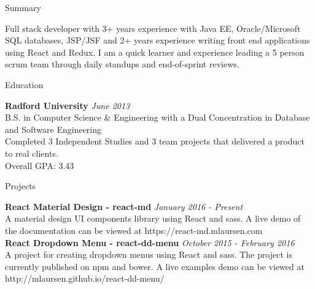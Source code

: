 \documentclass{resume} %
\begin{document}

\begin{rSection}{Summary}

Full stack developer with 3+ years experience with Java EE, Oracle/Microsoft SQL databases, JSP/JSF and 2+ years experience writing front end applications using React and Redux. I am a quick learner and experience leading a 5 person scrum team through daily standups and end-of-sprint reviews.

\end{rSection}


\begin{rSection}{Education}

{\bf Radford University} \hfill {\em June 2013} \\ 
B.S. in Computer Science \& Engineering with a Dual Concentration in Database and Software Engineering \\
Completed 3 Independent Studies and 3 team projects that delivered a product to real clients. \\
Overall GPA: 3.43

\end{rSection}




\begin{rSection}{Projects}

{\bf React Material Design - react-md} \hfill {\em January 2016 - Present} \\ 

A material design UI components library using React and sass. A live demo of the documentation can be viewed at https://react-md.mlaursen.com \\

{\bf React Dropdown Menu - react-dd-menu} \hfill {\em October 2015 - February 2016} \\ 

A project for creating dropdown menus using React and sass. The project is currently published on npm and bower. A live examples demo can be viewed at http://mlaursen.github.io/react-dd-menu/ \\

\end{rSection}
\end{document}
